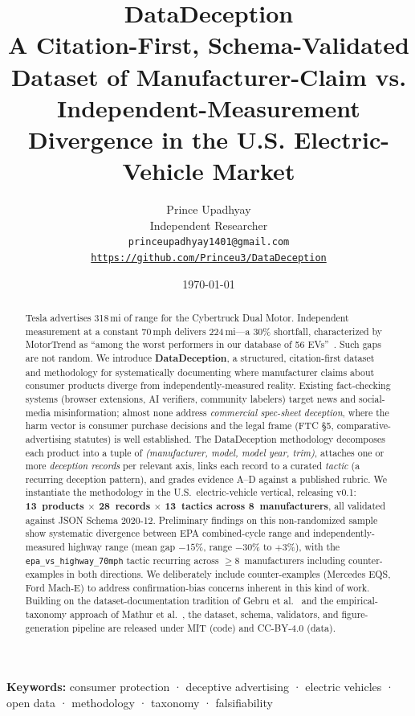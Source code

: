 \documentclass{article}
\title{\textbf{DataDeception}\\[6pt]
{\large A Citation-First, Schema-Validated Dataset of Manufacturer-Claim vs.\\
Independent-Measurement Divergence in the U.S. Electric-Vehicle Market}}
\author{
  Prince Upadhyay\\
  Independent Researcher\\
  \texttt{princeupadhyay1401@gmail.com}\\
  \texttt{\url{https://github.com/Princeu3/DataDeception}}
}
\date{\today}
\begin{document}
\maketitle

\begin{abstract}
Tesla advertises 318\,mi of range for the Cybertruck Dual Motor. Independent measurement at a constant 70\,mph delivers 224\,mi---a 30\% shortfall, characterized by MotorTrend as ``among the worst performers in our database of 56 EVs''~\cite{mt_cybertruck_2024}. Such gaps are not random. We introduce \textbf{DataDeception}, a structured, citation-first dataset and methodology for systematically documenting where manufacturer claims about consumer products diverge from independently-measured reality. Existing fact-checking systems (browser extensions, AI verifiers, community labelers) target news and social-media misinformation; almost none address \emph{commercial spec-sheet deception}, where the harm vector is consumer purchase decisions and the legal frame (FTC \S 5, comparative-advertising statutes) is well established. The DataDeception methodology decomposes each product into a tuple of \emph{(manufacturer, model, model year, trim)}, attaches one or more \emph{deception records} per relevant axis, links each record to a curated \emph{tactic} (a recurring deception pattern), and grades evidence A--D against a published rubric. We instantiate the methodology in the U.S.\ electric-vehicle vertical, releasing v0.1: \textbf{13~products $\times$ 28~records $\times$ 13~tactics across 8~manufacturers}, all validated against JSON Schema 2020-12. Preliminary findings on this non-randomized sample show systematic divergence between EPA combined-cycle range and independently-measured highway range (mean gap $-15\%$, range $-30\%$ to $+3\%$), with the \texttt{epa\_vs\_highway\_70mph} tactic recurring across $\geq 8$~manufacturers including counter-examples in both directions. We deliberately include counter-examples (Mercedes EQS, Ford Mach-E) to address confirmation-bias concerns inherent in this kind of work. Building on the dataset-documentation tradition of Gebru et al.~\cite{gebru_datasheets_2021} and the empirical-taxonomy approach of Mathur et al.~\cite{mathur_darkpatterns_2019}, the dataset, schema, validators, and figure-generation pipeline are released under MIT (code) and CC-BY-4.0 (data).
\end{abstract}

\noindent\textbf{Keywords:} consumer protection · deceptive advertising · electric vehicles · open data · methodology · taxonomy · falsifiability
\end{document}
